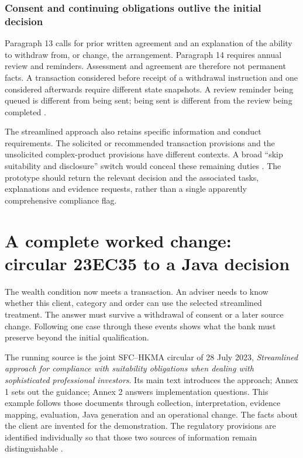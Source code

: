 \documentclass[12pt,a4paper,oneside,openany]{book}
\newcommand{\caseheading}[1]{\subsubsection*{#1}}
\begin{document}
\caseheading{Consent and continuing obligations outlive the initial decision}
Paragraph 13 calls for prior written agreement and an explanation of the ability
to withdraw from, or change, the arrangement. Paragraph 14 requires annual review
and reminders. Assessment and agreement are therefore not permanent facts. A
transaction considered before receipt of a withdrawal instruction and one
considered afterwards require different state snapshots. A review reminder being
queued is different from being sent; being sent is different from the review
being completed \citep[Annex 1, paras.~12--14]{sfcspiannex1}.

The streamlined approach also retains specific information and conduct
requirements. The solicited or recommended transaction provisions and the
unsolicited complex-product provisions have different contexts. A broad
``skip suitability and disclosure'' switch would conceal these remaining duties
\citep[Annex 1, paras.~9--11]{sfcspiannex1}. The prototype should return the
relevant decision and the associated tasks, explanations and evidence requests,
rather than a single apparently comprehensive compliance flag.

\section{A complete worked change: circular 23EC35 to a Java decision}

The wealth condition now meets a transaction. An adviser needs to know whether
this client, category and order can use the selected streamlined treatment. The
answer must survive a withdrawal of consent or a later source change. Following
one case through these events shows what the bank must preserve beyond the
initial qualification.

\label{merge:P-01b-complete-dry-run:00}

\label{sec:dry-run}

The running source is the joint SFC--HKMA circular of 28 July 2023,
\emph{Streamlined approach for compliance with suitability obligations when
dealing with sophisticated professional investors}. Its main text introduces
the approach; Annex 1 sets out the guidance; Annex 2 answers implementation
questions. This example follows those documents through collection,
interpretation, evidence mapping, evaluation, Java generation and an operational
change. The facts about the client are invented for the demonstration. The
regulatory provisions are identified individually so that those two sources of
information remain distinguishable \citep{sfcspi,sfcspiannex1,sfcspiannex2}.
\end{document}
